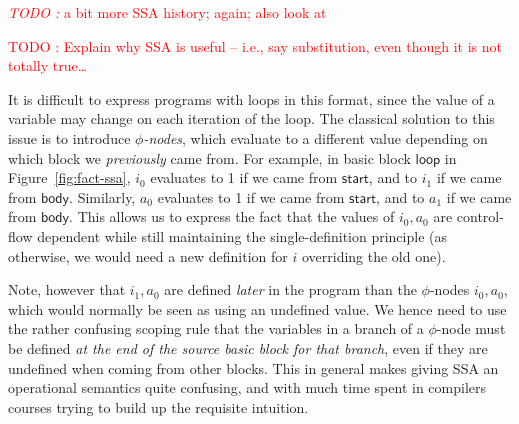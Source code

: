 \documentclass[acmsmall,screen,review]{acmart}
\newcounter{todos}
\newcommand{\TODO}[1]{{
  \stepcounter{todos}
  \begin{center}\large{\textcolor{red}{\emph{TODO \arabic{todos}:} #1}}\end{center}
}}
\newcommand{\todo}[1]{\stepcounter{todos} \textcolor{red}{TODO \arabic{todos}: #1}}
\newcommand{\ms}[1]{\ensuremath{\mathsf{#1}}}
\begin{document}
\TODO{a bit more SSA history; \citet{cytron-ssa-intro-91} again; also look at
\citet{alpern-ssa-original-88}}

\todo{Explain why SSA is useful -- i.e., say substitution, even though it is not totally true\ldots}

It is difficult to express programs with loops in this format, since the value of a
variable may change on each iteration of the loop. The classical solution to this issue is to
introduce \textit{$\phi$-nodes}, which evaluate to a different value depending on which block we
\textit{previously} came from. For example, in basic block \ms{loop} in
Figure~\ref{fig:fact-ssa}, $i_0$ evaluates to 1 if we came from \ms{start}, and to $i_1$ if we
came from \ms{body}. Similarly, $a_0$ evaluates to 1 if we came from \ms{start}, and to $a_1$ if we
came from \ms{body}. This allows us to express the fact that the values of $i_0, a_0$ are
control-flow dependent while still maintaining the single-definition principle (as otherwise, we
would need a new definition for $i$ overriding the old one).

Note, however that $i_1, a_0$ are defined \textit{later} in the program than the
$\phi$-nodes $i_0, a_0$, which would normally be seen as using an undefined
value. We hence need to use the rather confusing scoping rule that the variables
in a branch of a $\phi$-node must be defined \textit{at the end of the source
basic block for that branch}, even if they are undefined when coming from other blocks. This in
general makes giving SSA an operational semantics quite confusing, and with much
time spent in compilers courses trying to build up the requisite intuition.
\end{document}
